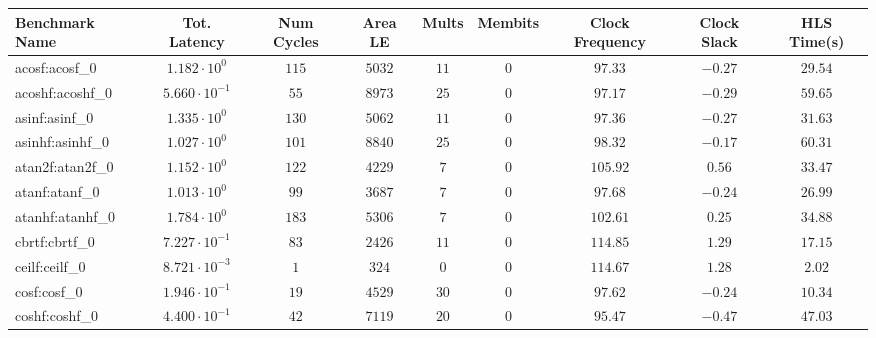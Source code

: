 \begin{tabular}{|l|c|c|c|c|c|c|c|c|}
\hline
Benchmark Name               & Tot. Latency            & Num Cycles & Area LE    & Mults   & Membits  & Clock Frequency & Clock Slack & HLS Time(s) \\
\hline
acosf:acosf\_0               & $ 1.182 \cdot 10^{0}  $ & $ 115    $ & $ 5032   $ & $ 11  $ & $ 0    $ & $ 97.33       $ & $ -0.27   $ & $ 29.54   $ \\
acoshf:acoshf\_0             & $ 5.660 \cdot 10^{-1} $ & $ 55     $ & $ 8973   $ & $ 25  $ & $ 0    $ & $ 97.17       $ & $ -0.29   $ & $ 59.65   $ \\
asinf:asinf\_0               & $ 1.335 \cdot 10^{0}  $ & $ 130    $ & $ 5062   $ & $ 11  $ & $ 0    $ & $ 97.36       $ & $ -0.27   $ & $ 31.63   $ \\
asinhf:asinhf\_0             & $ 1.027 \cdot 10^{0}  $ & $ 101    $ & $ 8840   $ & $ 25  $ & $ 0    $ & $ 98.32       $ & $ -0.17   $ & $ 60.31   $ \\
atan2f:atan2f\_0             & $ 1.152 \cdot 10^{0}  $ & $ 122    $ & $ 4229   $ & $ 7   $ & $ 0    $ & $ 105.92      $ & $ 0.56    $ & $ 33.47   $ \\
atanf:atanf\_0               & $ 1.013 \cdot 10^{0}  $ & $ 99     $ & $ 3687   $ & $ 7   $ & $ 0    $ & $ 97.68       $ & $ -0.24   $ & $ 26.99   $ \\
atanhf:atanhf\_0             & $ 1.784 \cdot 10^{0}  $ & $ 183    $ & $ 5306   $ & $ 7   $ & $ 0    $ & $ 102.61      $ & $ 0.25    $ & $ 34.88   $ \\
cbrtf:cbrtf\_0               & $ 7.227 \cdot 10^{-1} $ & $ 83     $ & $ 2426   $ & $ 11  $ & $ 0    $ & $ 114.85      $ & $ 1.29    $ & $ 17.15   $ \\
ceilf:ceilf\_0               & $ 8.721 \cdot 10^{-3} $ & $ 1      $ & $ 324    $ & $ 0   $ & $ 0    $ & $ 114.67      $ & $ 1.28    $ & $ 2.02    $ \\
cosf:cosf\_0                 & $ 1.946 \cdot 10^{-1} $ & $ 19     $ & $ 4529   $ & $ 30  $ & $ 0    $ & $ 97.62       $ & $ -0.24   $ & $ 10.34   $ \\
coshf:coshf\_0               & $ 4.400 \cdot 10^{-1} $ & $ 42     $ & $ 7119   $ & $ 20  $ & $ 0    $ & $ 95.47       $ & $ -0.47   $ & $ 47.03   $ \\

\end{tabular}
